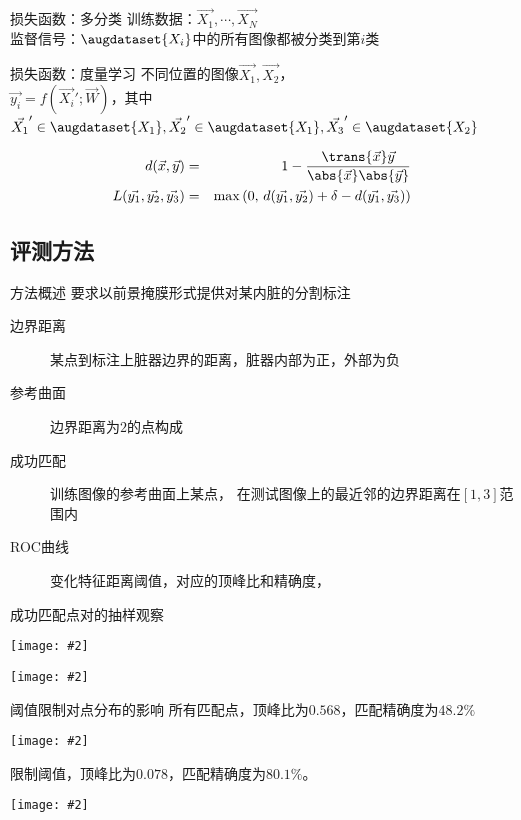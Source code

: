 \documentclass {beamer}
\newcommand{\addgraph}[2]{\begin{center}
\texttt{[image: \#2]}\end{center}}
\begin{document}
\begin{frame}{损失函数：多分类}
    训练数据：$\vec{X_1},\cdots,\vec{X_N}$ \\
    监督信号：$\augdataset{X_i}$中的所有图像都被分类到第$i$类
\end{frame}

\begin{frame}{损失函数：度量学习}
    不同位置的图像$\vec{X_1}, \vec{X_2}$， \\
    $\vec{y_i}=f(\vec{X_i}';\vec{W})$，其中 \\
    $\vec{X_1}' \in \augdataset{X_1}, \vec{X_2}' \in \augdataset{X_1},
    \vec{X_3}' \in \augdataset{X_2}$

    \begin{eqnarray}
        d(\vec{x}, \vec{y}) &=& 1 -
            \frac{\trans{\vec{x}}\vec{y}}{\abs{\vec{x}}\abs{\vec{y}}} \nonumber
            \\
        L(\vec{y_1}, \vec{y_2}, \vec{y_3}) &=&
            \max\left(0,\,
                d(\vec{y_1}, \vec{y_2}) + \delta - d(\vec{y_1}, \vec{y_3})
            \right)
        \label{eqn:cnn:mtrc:loss}
    \end{eqnarray}
\end{frame}


\subsection{评测方法}
\begin{frame}{方法概述}
    要求以前景掩膜形式提供对某内脏的分割标注
    \begin{description}
        \item[边界距离] 某点到标注上脏器边界的距离，脏器内部为正，外部为负
        \item[参考曲面] 边界距离为$2$的点构成
        \item[成功匹配] 训练图像的参考曲面上某点，
            在测试图像上的最近邻的边界距离在$[1, 3]$范围内
        \item[ROC曲线] 变化特征距离阈值，对应的顶峰比和精确度，
    \end{description}
\end{frame}

\begin{frame}{成功匹配点对的抽样观察}
    \addgraph{0.8}{res/expr-match/pt-patch.png}

    \addgraph{0.8}{res/expr-match/pt-bd-dist.png}
\end{frame}

\begin{frame}{阈值限制对点分布的影响}
    所有匹配点，顶峰比为$0.568$，匹配精确度为$48.2\%$
    \addgraph{0.7}{res/expr-match/48.2-half.png}

    限制阈值，顶峰比为$0.078$，匹配精确度为$80.1\%$。
    \addgraph{0.7}{res/expr-match/80.1-half.png}
\end{frame}
\end{document}
